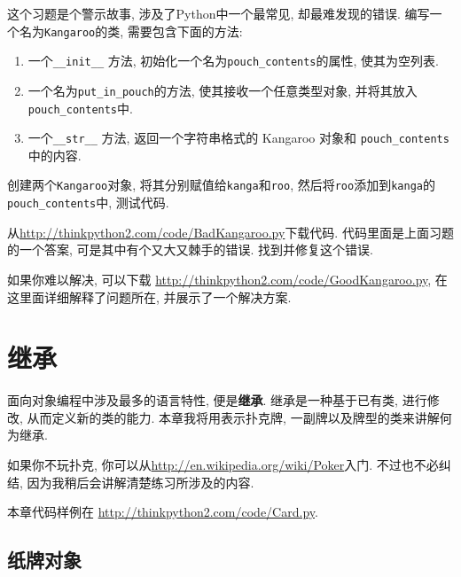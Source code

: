 \documentclass[10pt]{book}
\begin{document}
\begin{exercise}
\label{kangaroo}

这个习题是个警示故事, 涉及了Python中一个最常见, 却最难发现的错误. 
编写一个名为{\tt Kangaroo}的类, 需要包含下面的方法:

\begin{enumerate}

\item 一个\verb"__init__" 方法, 初始化一个名为\verb"pouch_contents"的属性, 
使其为空列表. 

\item 一个名为\verb"put_in_pouch"的方法, 使其接收一个任意类型对象, 并将其放入
\verb"pouch_contents"中. 

\item 一个\verb"__str__" 方法, 返回一个字符串格式的 Kangaroo 对象和 \verb"pouch_contents" 中的内容. 

\end{enumerate}
%
创建两个{\tt Kangaroo}对象, 将其分别赋值给{\tt kanga}和{\tt roo}, 
然后将{\tt roo}添加到{\tt kanga}的\verb"pouch_contents"中, 测试代码. 

从\url{http://thinkpython2.com/code/BadKangaroo.py}下载代码. 
代码里面是上面习题的一个答案, 
可是其中有个又大又棘手的错误. 找到并修复这个错误. 

如果你难以解决, 可以下载
\url{http://thinkpython2.com/code/GoodKangaroo.py}, 
在这里面详细解释了问题所在, 并展示了一个解决方案. 

\end{exercise}


\chapter{继承}

面向对象编程中涉及最多的语言特性, 便是{\bf 继承}. 
继承是一种基于已有类, 进行修改, 从而定义新的类的能力. 
本章我将用表示扑克牌, 一副牌以及牌型的类来讲解何为继承. 

如果你不玩扑克, 你可以从\url{http://en.wikipedia.org/wiki/Poker}入门. 
不过也不必纠结, 因为我稍后会讲解清楚练习所涉及的内容. 

本章代码样例在
\url{http://thinkpython2.com/code/Card.py}.


\section{纸牌对象}
\end{document}

